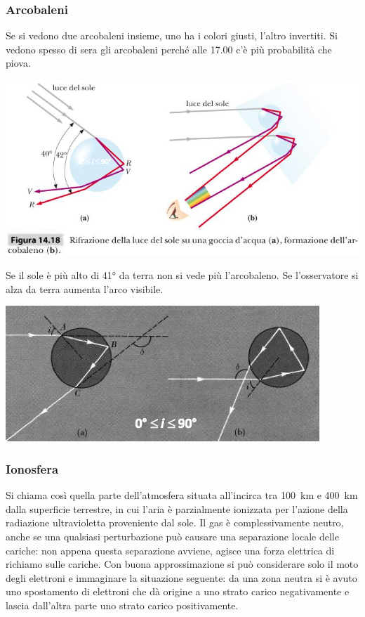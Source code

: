 \subsubsection{Arcobaleni}
Se si vedono due arcobaleni insieme, uno ha i colori giusti, l'altro invertiti. Si vedono spesso di sera gli arcobaleni perché alle 17.00 c'è più probabilità che piova.
\begin{center}
\includegraphics[width=\textwidth]{immagini/arcobaleno1.png}
\end{center}
Se il sole è più alto di \ang{41;;} da terra non si vede più l'arcobaleno. Se l'osservatore si alza da terra aumenta l'arco visibile.
\begin{center}
\includegraphics[width=\textwidth]{immagini/arcobaleno2.png}
\end{center}

\subsubsection{Ionosfera}
Si chiama così quella parte dell'atmosfera situata all'incirca tra \SI{100}{\kilo\metre} e \SI{400}{\kilo\metre} dalla superficie terrestre, in cui l'aria è parzialmente ionizzata per l'azione della radiazione ultravioletta proveniente dal sole. Il gas è complessivamente neutro, anche se una qualsiasi perturbazione può causare una separazione locale delle cariche: non appena questa separazione avviene, agisce una forza elettrica di richiamo sulle cariche. Con buona approssimazione si può considerare solo il moto degli elettroni e immaginare la situazione seguente: da una zona neutra si è avuto uno spostamento di elettroni che dà origine a uno strato carico negativamente e lascia dall'altra parte uno strato carico positivamente.

